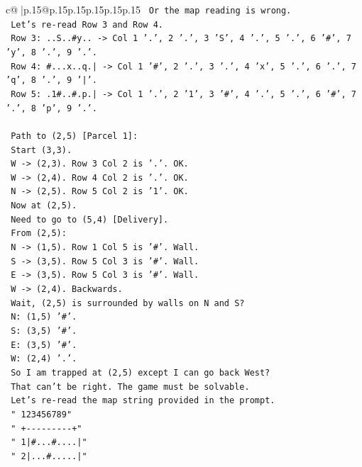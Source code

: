\documentclass{article}
\begin{document}
{\begin{supertabular}{c@{$\;$}|p{.15\linewidth}@{}p{.15\linewidth}p{.15\linewidth}p{.15\linewidth}p{.15\linewidth}p{.15\linewidth}}
{{{\texttt{  Or the map reading is wrong.} \\
\texttt{  Let's re{-}read Row 3 and Row 4.} \\
\texttt{  Row 3: ..S..\#y.. {-}> Col 1 '.', 2 '.', 3 'S', 4 '.', 5 '.', 6 '\#', 7 'y', 8 '.', 9 '.'.} \\
\texttt{  Row 4: \#...x..q.| {-}> Col 1 '\#', 2 '.', 3 '.', 4 'x', 5 '.', 6 '.', 7 'q', 8 '.', 9 '|'.} \\
\texttt{  Row 5: .1\#..\#.p.| {-}> Col 1 '.', 2 '1', 3 '\#', 4 '.', 5 '.', 6 '\#', 7 '.', 8 'p', 9 '.'.} \\
\\ 
\texttt{  Path to (2,5) {[}Parcel 1{]}:} \\
\texttt{  Start (3,3).} \\
\texttt{  W {-}> (2,3). Row 3 Col 2 is '.'. OK.} \\
\texttt{  W {-}> (2,4). Row 4 Col 2 is '.'. OK.} \\
\texttt{  N {-}> (2,5). Row 5 Col 2 is '1'. OK.} \\
\texttt{  Now at (2,5).} \\
\texttt{  Need to go to (5,4) {[}Delivery{]}.} \\
\texttt{  From (2,5):} \\
\texttt{  N {-}> (1,5). Row 1 Col 5 is '\#'. Wall.} \\
\texttt{  S {-}> (3,5). Row 5 Col 3 is '\#'. Wall.} \\
\texttt{  E {-}> (3,5). Row 5 Col 3 is '\#'. Wall.} \\
\texttt{  W {-}> (2,4). Backwards.} \\
\texttt{  Wait, (2,5) is surrounded by walls on N and S?} \\
\texttt{  N: (1,5) '\#'.} \\
\texttt{  S: (3,5) '\#'.} \\
\texttt{  E: (3,5) '\#'.} \\
\texttt{  W: (2,4) '.'.} \\
\texttt{  So I am trapped at (2,5) except I can go back West?} \\
\texttt{  That can't be right. The game must be solvable.} \\
\texttt{  Let's re{-}read the map string provided in the prompt.} \\
\texttt{  "   123456789"} \\
\texttt{  "  +{-}{-}{-}{-}{-}{-}{-}{-}{-}+"} \\
\texttt{  " 1|\#...\#....|"} \\
\texttt{  " 2|...\#.....|"} \\
}}}
\end{supertabular}}
\end{document}
